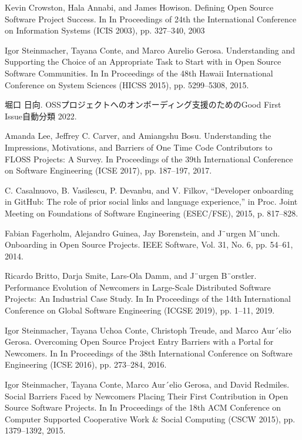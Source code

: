 \documentclass[11pt]{jreport}
\begin{document}
\begin{thebibliography}{99}

    Kevin Crowston, Hala Annabi, and James Howison. Defining Open Source Software Project
Success. In In Proceedings of 24th the International Conference on Information Systems
(ICIS 2003), pp. 327–340, 2003

    Igor Steinmacher, Tayana Conte, and Marco Aurelio Gerosa. Understanding and Supporting
the Choice of an Appropriate Task to Start with in Open Source Software Communities.
In In Proceedings of the 48th Hawaii International Conference on System Sciences (HICSS
2015), pp. 5299–5308, 2015.

    堀口 日向. OSSプロジェクトへのオンボーディング支援のためのGood First Issue自動分類 2022.

    Amanda Lee, Jeffrey C. Carver, and Amiangshu Bosu. Understanding the Impressions,
Motivations, and Barriers of One Time Code Contributors to FLOSS Projects: A Survey.
In Proceedings of the 39th International Conference on Software Engineering (ICSE 2017),
pp. 187–197, 2017.

C. Casalnuovo, B. Vasilescu, P. Devanbu, and V. Filkov, “Developer
onboarding in GitHub: The role of prior social links and language experience,” in Proc. Joint Meeting on Foundations of Software Engineering
(ESEC/FSE), 2015, p. 817–828.

Fabian Fagerholm, Alejandro Guinea, Jay Borenstein, and J¨urgen M¨unch. Onboarding in
Open Source Projects. IEEE Software, Vol. 31, No. 6, pp. 54–61, 2014.

 Ricardo Britto, Darja Smite, Lars-Ola Damm, and J¨urgen B¨orstler. Performance Evolution
of Newcomers in Large-Scale Distributed Software Projects: An Industrial Case Study. In In
Proceedings of the 14th International Conference on Global Software Engineering (ICGSE
2019), pp. 1–11, 2019.

 Igor Steinmacher, Tayana Uchoa Conte, Christoph Treude, and Marco Aur´elio Gerosa.
Overcoming Open Source Project Entry Barriers with a Portal for Newcomers. In In
Proceedings of the 38th International Conference on Software Engineering (ICSE 2016),
pp. 273–284, 2016.

Igor Steinmacher, Tayana Conte, Marco Aur´elio Gerosa, and David Redmiles. Social Barriers Faced by Newcomers Placing Their First Contribution in Open Source Software Projects.
In In Proceedings of the 18th ACM Conference on Computer Supported Cooperative Work & Social Computing (CSCW 2015), pp. 1379–1392, 2015.


\end{thebibliography}
\end{document}
